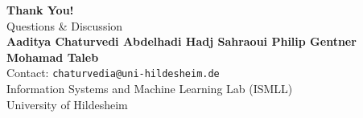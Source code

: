 \documentclass[aspectratio=169, 10pt]{beamer}
\begin{document}
\begin{frame}
\begin{center}
\vspace{0.6cm}
{\Large \textbf{Thank You!}} \\
\vspace{0.4cm}
{\large Questions \& Discussion} \\
\vspace{0.6cm}
\textbf{Aaditya Chaturvedi \quad Abdelhadi Hadj Sahraoui \quad Philip Gentner \quad Mohamad Taleb} \\
\vspace{0.25cm}
\small Contact: \texttt{chaturvedia@uni-hildesheim.de} \\
\vspace{0.25cm}
Information Systems and Machine Learning Lab (ISMLL) \\
University of Hildesheim
\end{center}
\end{frame}
\end{document}
